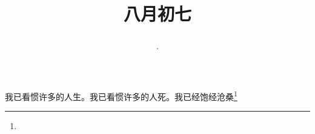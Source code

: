 \title{\date[d=9,m=9,y=2024][year:cn-y,年,month:cn,day:cn,日,·,weekday]·八月初七 }
我已看惯许多的人生。我已看惯许多的人死。我已经饱经沧桑\footnote{ }

